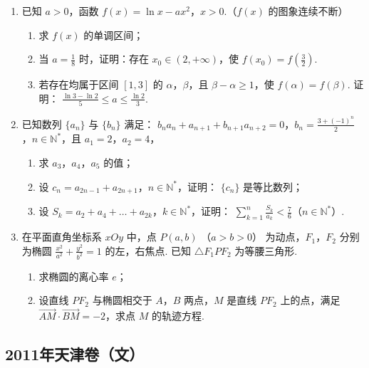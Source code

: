 \begin{description}
\begin{enumerate}[leftmargin=5pt]
        \item 已知 \(a > 0\)，函数 \(f(x) = \ln x - ax^2\)，\(x > 0\).（\(f(x)\) 的图象连续不断）
\begin{enumerate}
\item 求 \( f(x) \) 的单调区间；
\item 当 \(a = \frac{1}{8}\) 时，证明：存在 \(x_0 \in (2, +\infty)\)，使 \(f(x_0) = f\left(\frac{3}{2}\right)\).
\item 若存在均属于区间 \([1,3]\) 的 \(\alpha\)，\(\beta\)，且 \(\beta - \alpha \geqslant 1\)，使 \(f(\alpha) = f(\beta)\). 证明： \(\frac{\ln 3 - \ln 2}{5} \leqslant a \leqslant \frac{\ln 2}{3}\).
\end{enumerate}

        \item 已知数列 \(\{a_{n}\}\) 与 \(\{b_{n}\}\) 满足： \(b_{n}a_{n} + a_{n + 1} + b_{n + 1}a_{n + 2} = 0\)，\(b_{n} = \frac{3 + (-1)^{n}}{2}\)，\(n \in \mathbb{N}^{*}\)，且 \(a_{1} = 2\)，\(a_{2} = 4\)，
\begin{enumerate}
\item 求 \(a_{3}\)，\(a_{4}\)，\(a_{5}\) 的值；
\item 设 \(c_{n} = a_{2n - 1} + a_{2n + 1}\)，\(n \in \mathbb{N}^{*}\)，证明： \(\{c_{n}\}\) 是等比数列；
\item 设 \(S_{k} = a_{2} + a_{4} + \dots + a_{2k}\)，\(k \in \mathbb{N}^{*}\)，证明： \(\sum_{k=1}^{n} \frac{S_{k}}{a_{k}} < \frac{7}{6}\)（\(n \in \mathbb{N}^{*}\)）.
\end{enumerate}

        \item 在平面直角坐标系 \(xOy\) 中，点 \(P(a,b)\) （\(a > b > 0\)） 为动点，\(F_{1}\)，\(F_{2}\) 分别为椭圆 \(\frac{x^2}{a^2} + \frac{y^2}{b^2} = 1\) 的左，右焦点. 已知 \(\triangle F_1PF_2\) 为等腰三角形.
\begin{enumerate}
\item 求椭圆的离心率 \(e\)；
\item 设直线 \(PF_{2}\) 与椭圆相交于 \(A\)，\(B\) 两点，\(M\) 是直线 \(PF_{2}\) 上的点，满足 \(\overrightarrow{AM} \cdot \overrightarrow{BM} = -2\)，求点 \(M\) 的轨迹方程.
\end{enumerate}

    \end{enumerate}

\end{description}


\subsection{2011年天津卷（文）}\label{gk:2011年天津卷（文）}

